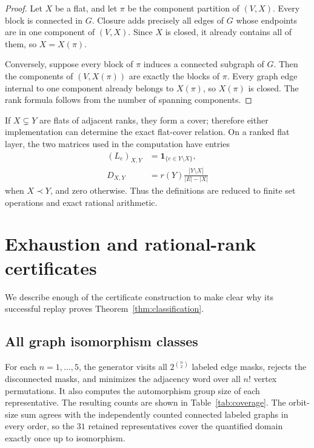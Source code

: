 \documentclass[11pt]{article}
\theoremstyle{remark}
\begin{document}
\begin{proof}
Let $X$ be a flat, and let $\pi$ be the component partition of $(V,X)$.
Every block is connected in $G$.  Closure adds precisely all edges of $G$
whose endpoints are in one component of $(V,X)$.  Since $X$ is closed, it
already contains all of them, so $X=X(\pi)$.

Conversely, suppose every block of $\pi$ induces a connected subgraph of
$G$.  Then the components of $(V,X(\pi))$ are exactly the blocks of $\pi$.
Every graph edge internal to one component already belongs to $X(\pi)$, so
$X(\pi)$ is closed.  The rank formula follows from the number of spanning
components.
\end{proof}

If $X\subsetneq Y$ are flats of adjacent ranks, they form a cover; therefore
either implementation can determine the exact flat-cover relation.  On a
ranked flat layer, the two matrices used in the computation have entries
\begin{align}
 (L_e)_{X,Y}&=\mathbf{1}_{\{e\in Y\setminus X\}},
 \label{eq:Le}\tag{1}\\
 D_{X,Y}&=r(Y)\frac{|Y\setminus X|}{|E|-|X|}
 \label{eq:D}\tag{2}
\end{align}
when $X\prec Y$, and zero otherwise.  Thus the definitions are reduced to
finite set operations and exact rational arithmetic.

\section{Exhaustion and rational-rank certificates}

We describe enough of the certificate construction to make clear why its
successful replay proves Theorem~\ref{thm:classification}.

\subsection{All graph isomorphism classes}

For each $n=1,\ldots,5$, the generator visits all
$2^{\binom n2}$ labeled edge masks, rejects the disconnected masks, and
minimizes the adjacency word over all $n!$ vertex permutations.  It also
computes the automorphism group size of each representative.  The resulting
counts are shown in Table~\ref{tab:coverage}.  The orbit-size sum agrees with
the independently counted connected labeled graphs in every order, so the
$31$ retained representatives cover the quantified domain exactly once up
to isomorphism.
\end{document}
